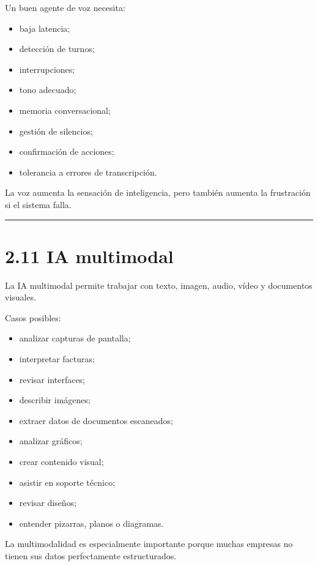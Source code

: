Un buen agente de voz necesita:

\begin{itemize}
\tightlist
\item
  baja latencia;
\item
  detección de turnos;
\item
  interrupciones;
\item
  tono adecuado;
\item
  memoria conversacional;
\item
  gestión de silencios;
\item
  confirmación de acciones;
\item
  tolerancia a errores de transcripción.
\end{itemize}

La voz aumenta la sensación de inteligencia, pero también aumenta la
frustración si el sistema falla.

\begin{center}\rule{0.5\linewidth}{0.5pt}\end{center}

\section{2.11 IA multimodal}\label{ia-multimodal}

La IA multimodal permite trabajar con texto, imagen, audio, vídeo y
documentos visuales.

Casos posibles:

\begin{itemize}
\tightlist
\item
  analizar capturas de pantalla;
\item
  interpretar facturas;
\item
  revisar interfaces;
\item
  describir imágenes;
\item
  extraer datos de documentos escaneados;
\item
  analizar gráficos;
\item
  crear contenido visual;
\item
  asistir en soporte técnico;
\item
  revisar diseños;
\item
  entender pizarras, planos o diagramas.
\end{itemize}

La multimodalidad es especialmente importante porque muchas empresas no
tienen sus datos perfectamente estructurados.

